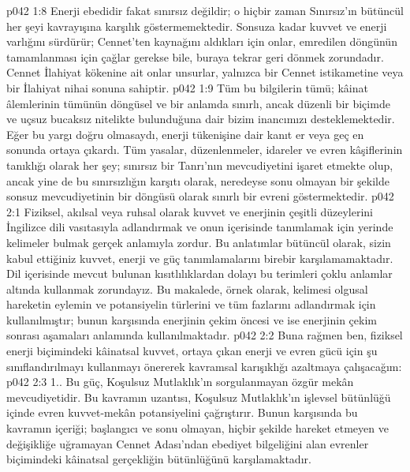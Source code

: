 \vs p042 1:8 Enerji ebedidir fakat sınırsız değildir; o hiçbir zaman Sınırsız’ın bütüncül her şeyi kavrayışına karşılık göstermemektedir. Sonsuza kadar kuvvet ve enerji varlığını sürdürür; Cennet’ten kaynağını aldıkları için onlar, emredilen döngünün tamamlanması için çağlar gerekse bile, buraya tekrar geri dönmek zorundadır. Cennet İlahiyat kökenine ait onlar unsurlar, yalnızca bir Cennet istikametine veya bir İlahiyat nihai sonuna sahiptir.
\vs p042 1:9 Tüm bu bilgilerin tümü; kâinat âlemlerinin tümünün döngüsel ve bir anlamda sınırlı, ancak düzenli bir biçimde ve uçsuz bucaksız nitelikte bulunduğuna dair bizim inancımızı desteklemektedir. Eğer bu yargı doğru olmasaydı, enerji tükenişine dair kanıt er veya geç en sonunda ortaya çıkardı. Tüm yasalar, düzenlenmeler, idareler ve evren kâşiflerinin tanıklığı olarak her şey; sınırsız bir Tanrı’nın mevcudiyetini işaret etmekte olup, ancak yine de bu sınırsızlığın karşıtı olarak, neredeyse sonu olmayan bir şekilde sonsuz mevcudiyetinin bir döngüsü olarak sınırlı bir evreni göstermektedir.
\vs p042 2:1 Fiziksel, akılsal veya ruhsal olarak kuvvet ve enerjinin çeşitli düzeylerini İngilizce dili vasıtasıyla adlandırmak ve onun içerisinde tanımlamak için yerinde kelimeler bulmak gerçek anlamıyla zordur. Bu anlatımlar bütüncül olarak, sizin kabul ettiğiniz kuvvet, enerji ve güç tanımlamalarını birebir karşılamamaktadır. Dil içerisinde mevcut bulunan kısıtlılıklardan dolayı bu terimleri çoklu anlamlar altında kullanmak zorundayız. Bu makalede, örnek olarak,  kelimesi olgusal hareketin eylemin ve potansiyelin türlerini ve tüm fazlarını adlandırmak için kullanılmıştır; bunun karşısında  enerjinin çekim öncesi ve  ise enerjinin çekim sonrası aşamaları anlamında kullanılmaktadır.
\vs p042 2:2 Buna rağmen ben, fiziksel enerji biçimindeki kâinatsal kuvvet, ortaya çıkan enerji ve evren gücü için şu sınıflandırılmayı kullanmayı önererek kavramsal karışıklığı azaltmaya çalışacağım:
\vs p042 2:3 1.\bibnobreakspace {}. Bu güç, Koşulsuz Mutlaklık’ın sorgulanmayan özgür mekân mevcudiyetidir. Bu kavramın uzantısı, Koşulsuz Mutlaklık’ın işlevsel bütünlüğü içinde evren kuvvet\hyp{}mekân potansiyelini çağrıştırır. Bunun karşısında bu kavramın içeriği; başlangıcı ve sonu olmayan, hiçbir şekilde hareket etmeyen ve değişikliğe uğramayan Cennet Adası’ndan ebediyet bilgeliğini alan evrenler biçimindeki kâinatsal gerçekliğin bütünlüğünü karşılamaktadır.

